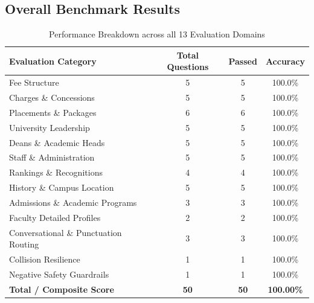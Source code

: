 \documentclass[11pt,a4paper]{article}
\begin{document}
\subsection{Overall Benchmark Results}
\begin{table}[H]
    \centering
    \begin{tabular}{@{}lccc@{}}
        \toprule
        \textbf{Evaluation Category} & \textbf{Total Questions} & \textbf{Passed} & \textbf{Accuracy} \\ \midrule
        Fee Structure & 5 & 5 & 100.0\% \\
        Charges \& Concessions & 5 & 5 & 100.0\% \\
        Placements \& Packages & 6 & 6 & 100.0\% \\
        University Leadership & 5 & 5 & 100.0\% \\
        Deans \& Academic Heads & 5 & 5 & 100.0\% \\
        Staff \& Administration & 5 & 5 & 100.0\% \\
        Rankings \& Recognitions & 4 & 4 & 100.0\% \\
        History \& Campus Location & 5 & 5 & 100.0\% \\
        Admissions \& Academic Programs & 3 & 3 & 100.0\% \\
        Faculty Detailed Profiles & 2 & 2 & 100.0\% \\
        Conversational \& Punctuation Routing & 3 & 3 & 100.0\% \\
        Collision Resilience & 1 & 1 & 100.0\% \\
        Negative Safety Guardrails & 1 & 1 & 100.0\% \\ \midrule
        \textbf{Total / Composite Score} & \textbf{50} & \textbf{50} & \textbf{100.00\%} \\ \bottomrule
    \end{tabular}
    \caption{Performance Breakdown across all 13 Evaluation Domains}
    \label{tab:benchmark_summary}
\end{table}
\end{document}

